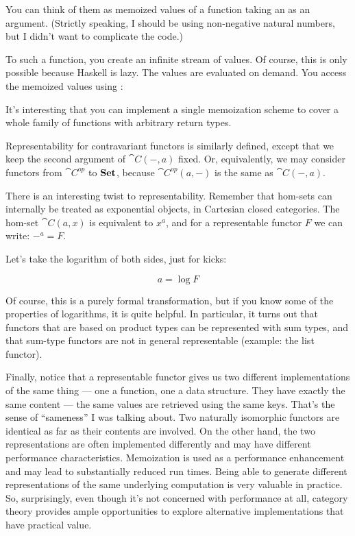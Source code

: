 You can think of them as memoized values of a function taking an
 as an argument. (Strictly speaking, I should be using
non-negative natural numbers, but I didn't want to complicate the code.)

To  such a function, you create an infinite stream of
values. Of course, this is only possible because Haskell is lazy. The
values are evaluated on demand. You access the memoized values using
:

It's interesting that you can implement a single memoization scheme to
cover a whole family of functions with arbitrary return types.

Representability for contravariant functors is similarly defined, except
that we keep the second argument of $\cat{C}(-, a)$ fixed. Or,
equivalently, we may consider functors from $\cat{C}^\mathit{op}$
to $\mathbf{Set}$, because $\cat{C}^\mathit{op}(a, -)$ is the same as
$\cat{C}(-, a)$.

There is an interesting twist to representability. Remember that
hom-sets can internally be treated as exponential objects, in Cartesian
closed categories. The hom-set $\cat{C}(a, x)$ is equivalent to
$x^a$, and for a representable functor $F$ we can write: $-^a = F$.

Let's take the logarithm of both sides, just for kicks:

\[a = \log F\]

Of course, this is a purely formal transformation, but if you know some
of the properties of logarithms, it is quite helpful. In particular, it
turns out that functors that are based on product types can be
represented with sum types, and that sum-type functors are not in
general representable (example: the list functor).

Finally, notice that a representable functor gives us two different
implementations of the same thing --- one a function, one a data
structure. They have exactly the same content --- the same values are
retrieved using the same keys. That's the sense of ``sameness'' I was
talking about. Two naturally isomorphic functors are identical as far as
their contents are involved. On the other hand, the two representations
are often implemented differently and may have different performance
characteristics. Memoization is used as a performance enhancement and
may lead to substantially reduced run times. Being able to generate
different representations of the same underlying computation is very
valuable in practice. So, surprisingly, even though it's not concerned
with performance at all, category theory provides ample opportunities to
explore alternative implementations that have practical value.

